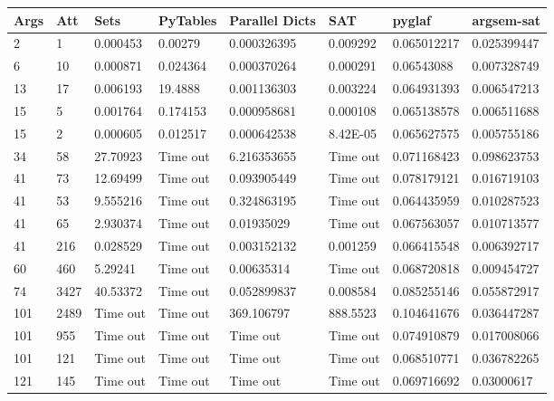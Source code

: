 
\begin{longtable}{@{}llllllll@{}}
\toprule
Args & Att & Sets     & PyTables & Parallel Dicts & SAT      & pyglaf      & argsem-sat  \\ \midrule
2         & 1       & 0.000453 & 0.00279  & 0.000326395    & 0.009292 & 0.065012217 & 0.025399447 \\
6         & 10      & 0.000871 & 0.024364 & 0.000370264    & 0.000291 & 0.06543088  & 0.007328749 \\
13        & 17      & 0.006193 & 19.4888  & 0.001136303    & 0.003224 & 0.064931393 & 0.006547213 \\
15        & 5       & 0.001764 & 0.174153 & 0.000958681    & 0.000108 & 0.065138578 & 0.006511688 \\
15        & 2       & 0.000605 & 0.012517 & 0.000642538    & 8.42E-05 & 0.065627575 & 0.005755186 \\
34        & 58      & 27.70923 & Time out & 6.216353655    & Time out & 0.071168423 & 0.098623753 \\
41        & 73      & 12.69499 & Time out & 0.093905449    & Time out & 0.078179121 & 0.016719103 \\
41        & 53      & 9.555216 & Time out & 0.324863195    & Time out & 0.064435959 & 0.010287523 \\
41        & 65      & 2.930374 & Time out & 0.01935029     & Time out & 0.067563057 & 0.010713577 \\
41        & 216     & 0.028529 & Time out & 0.003152132    & 0.001259 & 0.066415548 & 0.006392717 \\
60        & 460     & 5.29241  & Time out & 0.00635314     & Time out & 0.068720818 & 0.009454727 \\
74        & 3427    & 40.53372 & Time out & 0.052899837    & 0.008584 & 0.085255146 & 0.055872917 \\
101       & 2489    & Time out & Time out & 369.106797     & 888.5523 & 0.104641676 & 0.036447287 \\
101       & 955     & Time out & Time out & Time out       & Time out & 0.074910879 & 0.017008066 \\
101       & 121     & Time out & Time out & Time out       & Time out & 0.068510771 & 0.036782265 \\
121       & 145     & Time out & Time out & Time out       & Time out & 0.069716692 & 0.03000617  \\

\end{longtable}
